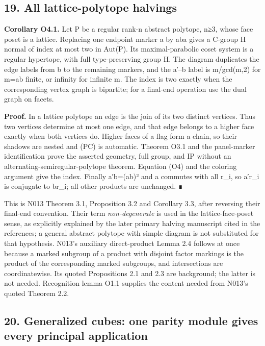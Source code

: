 \documentclass[
  10pt,
  letterpaper,
]{article}
\begin{document}
\subsection{19. All lattice-polytope
halvings}\label{all-lattice-polytope-halvings}

\textbf{Corollary O4.1.} Let P be a regular rank-n abstract polytope,
n≥3, whose face poset is a lattice. Replacing one endpoint marker a by
aba gives a C-group H normal of index at most two in Aut(P). Its
maximal-parabolic coset system is a regular hypertope, with full
type-preserving group H. The diagram duplicates the edge labels from b
to the remaining markers, and the a′--b label is m/gcd(m,2) for
m=\textbar ab\textbar{} finite, or infinity for infinite m. The index is
two exactly when the corresponding vertex graph is bipartite; for a
final-end operation use the dual graph on facets.

\textbf{Proof.} In a lattice polytope an edge is the join of its two
distinct vertices. Thus two vertices determine at most one edge, and
that edge belongs to a higher face exactly when both vertices do. Higher
faces of a flag form a chain, so their shadows are nested and (PC) is
automatic. Theorem O3.1 and the panel-marker identification prove the
asserted geometry, full group, and IP without an
alternating-semiregular-polytope theorem. Equation (O4) and the coloring
argument give the index. Finally a′b=(ab)² and a commutes with all r\_i,
so a′r\_i is conjugate to br\_i; all other products are unchanged. ∎

This is N013 Theorem 3.1, Proposition 3.2 and Corollary 3.3, after
reversing their final-end convention. Their term \emph{non-degenerate}
is used in the lattice-face-poset sense, as explicitly explained by the
later primary halving manuscript cited in the references; a general
abstract polytope with simple diagram is not substituted for that
hypothesis. N013's auxiliary direct-product Lemma 2.4 follows at once
because a marked subgroup of a product with disjoint factor markings is
the product of the corresponding marked subgroups, and intersections are
coordinatewise. Its quoted Propositions 2.1 and 2.3 are background; the
latter is not needed. Recognition lemma O1.1 supplies the content needed
from N013's quoted Theorem 2.2.

\subsection{20. Generalized cubes: one parity module gives every
principal
application}\label{generalized-cubes-one-parity-module-gives-every-principal-application}
\end{document}
